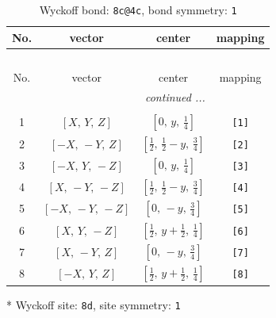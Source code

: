 \documentclass[fleqn,8pt]{jsarticle}
\begin{document}
\begin{longtable}{cccc}
\caption{Wyckoff bond: {\tt 8c@4c}, bond symmetry: {\tt 1}}
 \\
 \hline \hline
No. & vector & center & mapping \\ \hline \endfirsthead

\multicolumn{3}{l}{\tablename\ \thetable{}} \\
 \hline \hline
No. & vector & center & mapping \\ \hline \endhead

 \hline \hline
\multicolumn{3}{r}{\footnotesize\it continued ...} \\ \endfoot

 \hline \hline
\multicolumn{3}{r}{} \\ \endlastfoot

1 & $\left[ X,\, Y,\, Z \right]$ & $\left[ 0,\, y,\, \frac{1}{4} \right]$ & {\tt [1]} \\ \hline
2 & $\left[ - X,\, - Y,\, Z \right]$ & $\left[ \frac{1}{2},\, \frac{1}{2} - y,\, \frac{3}{4} \right]$ & {\tt [2]} \\ \hline
3 & $\left[ - X,\, Y,\, - Z \right]$ & $\left[ 0,\, y,\, \frac{1}{4} \right]$ & {\tt [3]} \\ \hline
4 & $\left[ X,\, - Y,\, - Z \right]$ & $\left[ \frac{1}{2},\, \frac{1}{2} - y,\, \frac{3}{4} \right]$ & {\tt [4]} \\ \hline
5 & $\left[ - X,\, - Y,\, - Z \right]$ & $\left[ 0,\, - y,\, \frac{3}{4} \right]$ & {\tt [5]} \\ \hline
6 & $\left[ X,\, Y,\, - Z \right]$ & $\left[ \frac{1}{2},\, y + \frac{1}{2},\, \frac{1}{4} \right]$ & {\tt [6]} \\ \hline
7 & $\left[ X,\, - Y,\, Z \right]$ & $\left[ 0,\, - y,\, \frac{3}{4} \right]$ & {\tt [7]} \\ \hline
8 & $\left[ - X,\, Y,\, Z \right]$ & $\left[ \frac{1}{2},\, y + \frac{1}{2},\, \frac{1}{4} \right]$ & {\tt [8]} \\
\end{longtable}
* Wyckoff site: {\tt 8d}, site symmetry: {\tt 1}
\renewcommand{\arraystretch}{1.2}
\end{document}
